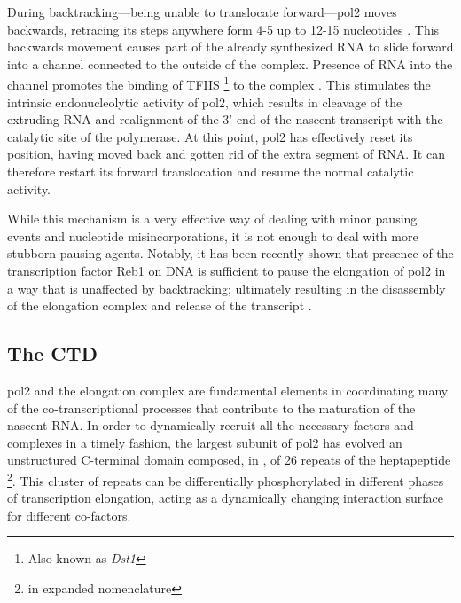 During backtracking---being unable to translocate forward---\gls{pol2} moves backwards, retracing its steps anywhere form 4-5 up to 12-15 nucleotides .
This backwards movement causes part of the already synthesized RNA to slide forward into a channel connected to the outside of the complex.
Presence of RNA into the channel promotes the binding of TFIIS \footnote{Also known as \emph{Dst1}} to the complex \citep{cheung:2011:structural}.
This stimulates the intrinsic endonucleolytic activity of \gls{pol2}, which results in cleavage of the extruding RNA and realignment of the 3' end of the nascent transcript with the catalytic site of the polymerase.
At this point, \gls{pol2} has effectively reset its position, having moved back and gotten rid of the extra segment of RNA. 
It can therefore restart its forward translocation and resume the normal catalytic activity.

While this mechanism is a very effective way of dealing with minor pausing events and nucleotide misincorporations, it is not enough to deal with more stubborn pausing agents.
Notably, it has been recently shown that presence of the transcription factor Reb1 on DNA is sufficient to pause the elongation of \gls{pol2} in a way that is unaffected by backtracking; ultimately resulting in the disassembly of the elongation complex and release of the transcript \cite{colin:2014:roadblock}.
 


\subsection{The CTD}
\gls{pol2} and the elongation complex are fundamental elements in coordinating many of the co-transcriptional processes that contribute to the maturation of the nascent RNA.
In order to dynamically recruit all the necessary factors and complexes in a timely fashion, the largest subunit of \gls{pol2} has evolved an unstructured C-terminal domain composed, in \cer, of 26 repeats of the heptapeptide \ctdshort{} \footnote{\ctdlong{} in expanded nomenclature}.
This cluster of repeats can be differentially phosphorylated in different phases of transcription elongation, acting as a dynamically changing interaction surface for different co-factors. 

